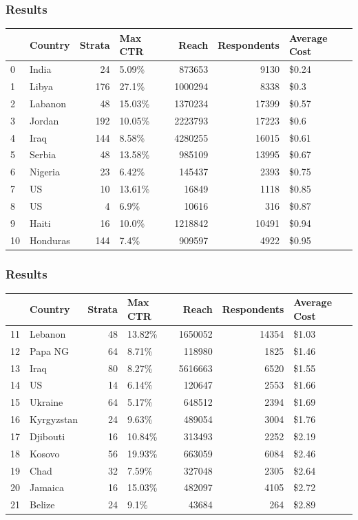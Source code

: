 \documentclass[aspectratio=169]{beamer}
\begin{document}
\begin{frame}
\frametitle{Results}
\begin{table}[H]
\begin{tabular}{llrlrrl}

\toprule
 & Country & Strata & Max CTR & Reach & Respondents & Average Cost \\
\midrule
0 & India & 24 & 5.09\% & 873653 & 9130 & \$0.24 \\
1 & Libya & 176 & 27.1\% & 1000294 & 8338 & \$0.3 \\
2 & Labanon & 48 & 15.03\% & 1370234 & 17399 & \$0.57 \\
3 & Jordan & 192 & 10.05\% & 2223793 & 17223 & \$0.6 \\
4 & Iraq & 144 & 8.58\% & 4280255 & 16015 & \$0.61 \\
5 & Serbia & 48 & 13.58\% & 985109 & 13995 & \$0.67 \\
6 & Nigeria & 23 & 6.42\% & 145437 & 2393 & \$0.75 \\
7 & US & 10 & 13.61\% & 16849 & 1118 & \$0.85 \\
8 & US & 4 & 6.9\% & 10616 & 316 & \$0.87 \\
9 & Haiti & 16 & 10.0\% & 1218842 & 10491 & \$0.94 \\
10 & Honduras & 144 & 7.4\% & 909597 & 4922 & \$0.95 \\
\bottomrule
\end{tabular}
\end{table}
\end{frame}

\begin{frame}
\frametitle{Results}
\begin{table}[H]
\begin{tabular}{llrlrrl}

\toprule
 & Country & Strata & Max CTR & Reach & Respondents & Average Cost \\
\midrule
11 & Lebanon & 48 & 13.82\% & 1650052 & 14354 & \$1.03 \\
12 & Papa NG & 64 & 8.71\% & 118980 & 1825 & \$1.46 \\
13 & Iraq & 80 & 8.27\% & 5616663 & 6520 & \$1.55 \\
14 & US & 14 & 6.14\% & 120647 & 2553 & \$1.66 \\
15 & Ukraine & 64 & 5.17\% & 648512 & 2394 & \$1.69 \\
16 & Kyrgyzstan & 24 & 9.63\% & 489054 & 3004 & \$1.76 \\
17 & Djibouti & 16 & 10.84\% & 313493 & 2252 & \$2.19 \\
18 & Kosovo & 56 & 19.93\% & 663059 & 6084 & \$2.46 \\
19 & Chad & 32 & 7.59\% & 327048 & 2305 & \$2.64 \\
20 & Jamaica & 16 & 15.03\% & 482097 & 4105 & \$2.72 \\
21 & Belize & 24 & 9.1\% & 43684 & 264 & \$2.89 \\
\bottomrule
\end{tabular}
\end{table}
\end{frame}
\end{document}
